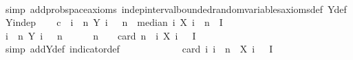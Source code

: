 \begin{isabellebody}
\ \ \ \ \isamarkupfalse%
\ {\isacharparenleft}{\kern0pt}simp\ add{\isacharcolon}{\kern0pt}prob{\isacharunderscore}{\kern0pt}space{\isacharunderscore}{\kern0pt}axioms\ indep{\isacharunderscore}{\kern0pt}interval{\isacharunderscore}{\kern0pt}bounded{\isacharunderscore}{\kern0pt}random{\isacharunderscore}{\kern0pt}variables{\isacharunderscore}{\kern0pt}axioms{\isacharunderscore}{\kern0pt}def\ Y{\isacharunderscore}{\kern0pt}def\ Y{\isacharunderscore}{\kern0pt}indep{\isacharparenright}{\kern0pt}\isanewline
\isanewline
\ \ \isamarkupfalse%
\ c{\isacharcolon}{\kern0pt}\ {\isachardoublequoteopen}{\isasymAnd}{\isasymomega}{\isachardot}{\kern0pt}\ {\isacharparenleft}{\kern0pt}{\isasymSum}i\ {\isacharequal}{\kern0pt}\ {}{\isachardot}{\kern0pt}{\isachardot}{\kern0pt}{\isacharless}{\kern0pt}n{\isachardot}{\kern0pt}\ Y\ i\ {\isasymomega}{\isacharparenright}{\kern0pt}\ {\isachargreater}{\kern0pt}\ n{\isacharslash}{\kern0pt}{}\ {\isasymLongrightarrow}\ median\ {\isacharparenleft}{\kern0pt}{\isasymlambda}i{\isachardot}{\kern0pt}\ X\ i\ {\isasymomega}{\isacharparenright}{\kern0pt}\ n\ {\isasymin}\ I{\isachardoublequoteclose}\isanewline
\ \ \isamarkupfalse%
\ {\isacharminus}{\kern0pt}\isanewline
\ \ \ \ \isamarkupfalse%
\ {\isasymomega}\isanewline
\ \ \ \ \isamarkupfalse%
\ {\isachardoublequoteopen}{\isacharparenleft}{\kern0pt}{\isasymSum}i\ {\isacharequal}{\kern0pt}\ {}{\isachardot}{\kern0pt}{\isachardot}{\kern0pt}{\isacharless}{\kern0pt}n{\isachardot}{\kern0pt}\ Y\ i\ {\isasymomega}{\isacharparenright}{\kern0pt}\ {\isachargreater}{\kern0pt}\ n{\isacharslash}{\kern0pt}{}{\isachardoublequoteclose}\isanewline
\ \ \ \ \isamarkupfalse%
\ {\isachardoublequoteopen}n\ {\isacharless}{\kern0pt}\ {}\ {\isacharasterisk}{\kern0pt}\ card\ {\isacharparenleft}{\kern0pt}{\isacharbraceleft}{\kern0pt}{}{\isachardot}{\kern0pt}{\isachardot}{\kern0pt}{\isacharless}{\kern0pt}n{\isacharbraceright}{\kern0pt}\ {\isasyminter}\ {\isacharbraceleft}{\kern0pt}i{\isachardot}{\kern0pt}\ X\ i\ {\isasymomega}\ {\isasymin}\ I{\isacharbraceright}{\kern0pt}{\isacharparenright}{\kern0pt}{\isachardoublequoteclose}\ \isanewline
\ \ \ \ \ \ \isamarkupfalse%
\ {\isacharparenleft}{\kern0pt}simp\ add{\isacharcolon}{\kern0pt}Y{\isacharunderscore}{\kern0pt}def\ indicator{\isacharunderscore}{\kern0pt}def{\isacharparenright}{\kern0pt}\ \isanewline
\ \ \ \ \isamarkupfalse%
\ \isamarkupfalse%
\ {\isachardoublequoteopen}{\isachardot}{\kern0pt}{\isachardot}{\kern0pt}{\isachardot}{\kern0pt}\ {\isacharequal}{\kern0pt}\ {}\ {\isacharasterisk}{\kern0pt}\ card\ {\isacharbraceleft}{\kern0pt}i{\isachardot}{\kern0pt}\ i\ {\isacharless}{\kern0pt}\ n\ {\isasymand}\ X\ i\ {\isasymomega}\ {\isasymin}\ I{\isacharbraceright}{\kern0pt}{\isachardoublequoteclose}\isanewline

\end{isabellebody}

